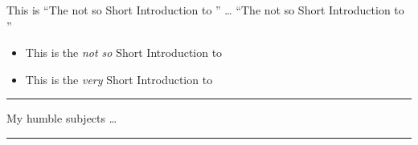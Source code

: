 \documentclass[10pt]{ctexart}
\begin{document}

\newcommand{\tnss}{The not so Short
Introduction to \LaTeXe}
This is ``\tnss'' \ldots{} ``\tnss''

\newcommand{\txsit}[1]{This is the 
\emph{#1} Short Introduction to \LaTeXe}
\begin{itemize}
      \item \txsit{not so}
      \item \txsit{very}
\end{itemize}



\newenvironment{king}
{\rule{1ex}{1ex}%
\hspace{\stretch{1}}}
{%
\rule{1ex}{1ex}}

\begin{king}
My humble subjects \ldots  
\end{king}


\end{document}
